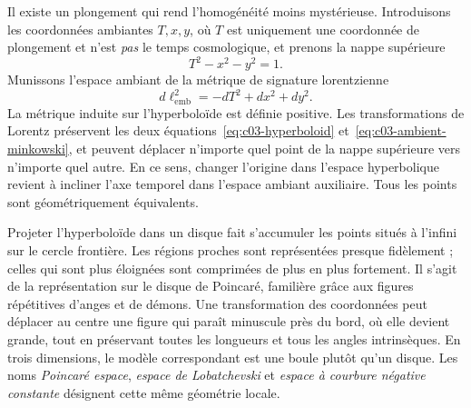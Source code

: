 Il existe un plongement qui rend l’homogénéité moins mystérieuse. Introduisons les coordonnées ambiantes \(T,x,y\), où \(T\) est uniquement une coordonnée de plongement et n’est \emph{pas} le temps cosmologique, et prenons la nappe supérieure
\begin{equation}
T^2 - x^2 - y^2 = 1.
\label{eq:c03-hyperboloid}
\end{equation}
Munissons l’espace ambiant de la métrique de signature lorentzienne
\begin{equation}
d\ell_{\mathrm{emb}}^2=-dT^2+dx^2+dy^2.
\label{eq:c03-ambient-minkowski}
\end{equation}
La métrique induite sur l’hyperboloïde est définie positive. Les transformations de Lorentz préservent les deux équations~\eqref{eq:c03-hyperboloid} et~\eqref{eq:c03-ambient-minkowski}, et peuvent déplacer n’importe quel point de la nappe supérieure vers n’importe quel autre. En ce sens, changer l’origine dans l’espace hyperbolique revient à incliner l’axe temporel dans l’espace ambiant auxiliaire. Tous les points sont géométriquement équivalents.

Projeter l’hyperboloïde dans un disque fait s’accumuler les points situés à l’infini sur le cercle frontière. Les régions proches sont représentées presque fidèlement ; celles qui sont plus éloignées sont comprimées de plus en plus fortement. Il s’agit de la représentation sur le disque de Poincar\'e, familière grâce aux figures répétitives d’anges et de démons. Une transformation des coordonnées peut déplacer au centre une figure qui paraît minuscule près du bord, où elle devient grande, tout en préservant toutes les longueurs et tous les angles intrinsèques. En trois dimensions, le modèle correspondant est une boule plutôt qu’un disque. Les noms \emph{Poincar\'e espace}, \emph{espace de Lobatchevski} et \emph{espace à courbure négative constante} désignent cette même géométrie locale.

\begin{classroomqa}
\end{classroomqa}

